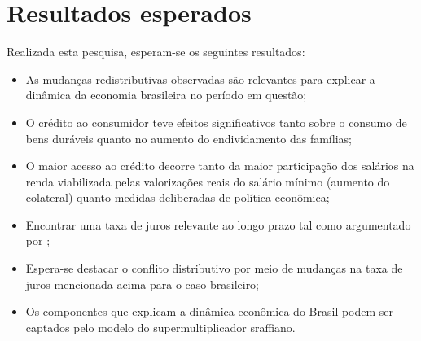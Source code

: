 \section{Resultados esperados}\label{Result}
Realizada esta pesquisa, esperam-se os seguintes resultados:
\begin{itemize}
	\item As mudanças redistributivas observadas são relevantes para explicar a dinâmica da economia brasileira no período em questão;
	\item O crédito ao consumidor teve efeitos significativos tanto sobre o consumo de bens duráveis quanto no aumento do endividamento das famílias;
	\item O maior acesso ao crédito decorre tanto da maior participação dos salários na renda viabilizada pelas valorizações reais do salário mínimo (aumento do colateral) quanto medidas deliberadas de política econômica;
	\item Encontrar uma taxa de juros relevante ao longo prazo tal como argumentado por \textcite{pivetti_essay_1992};
	\item Espera-se destacar o conflito distributivo por meio de mudanças na taxa de juros mencionada acima para o caso brasileiro;
	\item Os componentes que explicam a dinâmica econômica do Brasil podem ser captados pelo modelo do supermultiplicador sraffiano.
\end{itemize}